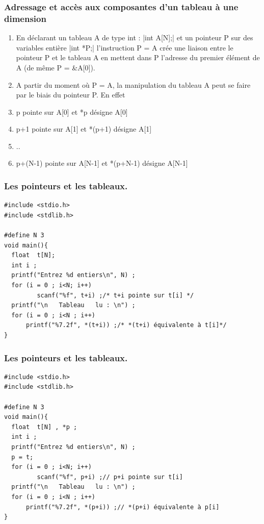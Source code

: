 \documentclass{beamer}
\begin{document}
\begin{frame}[fragile]
\frametitle{Adressage et accès aux composantes d'un tableau à une dimension}
\begin{enumerate}
\item En déclarant un tableau A de type int :
|int A[N];|
et un pointeur P sur des variables entière 
|int *P;|
 l'instruction P = A crée une liaison entre le pointeur P et le tableau A en mettent dans P l'adresse du premier élément de A (de même P = \&A[0]).
\item A partir du moment où P = A, la manipulation du tableau A peut se faire par le biais du pointeur P. En effet 
\item p          pointe sur A[0]       et       *p désigne A[0]
\item p+1     pointe sur A[1]    et    *(p+1) désigne A[1]
\item ..
\item p+(N-1)      pointe sur A[N-1]  et    *(p+N-1) désigne A[N-1]
\end{enumerate}

\end{frame}


\begin{frame}[fragile]
\frametitle{Les pointeurs et les tableaux.}	
\begin{verbatim}
#include <stdio.h>
#include <stdlib.h>

#define N 3
void main(){ 
  float  t[N];
  int i ;
  printf("Entrez %d entiers\n", N) ;
  for (i = 0 ; i<N; i++)
         scanf("%f", t+i) ;/* t+i pointe sur t[i] */
  printf("\n   Tableau   lu : \n") ;
  for (i = 0 ; i<N ; i++)
      printf("%7.2f", *(t+i)) ;/* *(t+i) équivalente à t[i]*/
}
\end{verbatim}

\end{frame}



\begin{frame}[fragile]
\frametitle{Les pointeurs et les tableaux.}	
\begin{verbatim}
#include <stdio.h>
#include <stdlib.h>

#define N 3
void main(){ 
  float  t[N] , *p ;
  int i ;
  printf("Entrez %d entiers\n", N) ;
  p = t;   
  for (i = 0 ; i<N; i++)
         scanf("%f", p+i) ;// p+i pointe sur t[i] 
  printf("\n   Tableau   lu : \n") ;
  for (i = 0 ; i<N ; i++)
      printf("%7.2f", *(p+i)) ;// *(p+i) équivalente à p[i]
}
\end{verbatim}

\end{frame}
\end{document}
